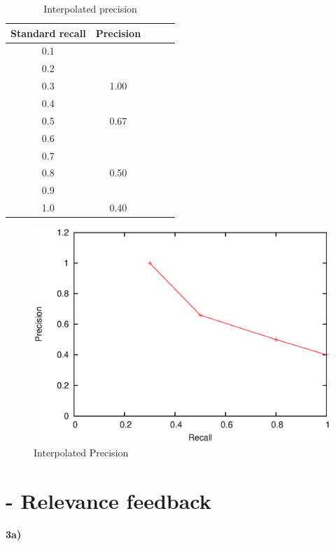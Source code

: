 \documentclass[a4paper, norsk, 11pt]{scrartcl} %
\numberwithin{equation}{section} %
\numberwithin{figure}{section} %
\numberwithin{table}{section} %
\begin{document}
\begin{table}[ht]
\centering
\begin{tabular}{c c c c c}
\hline
Standard recall & Precision \\ [0.5ex]
\hline
0.1 & \\
0.2 & \\
0.3 & 1.00\\
0.4 & \\
0.5 & 0.67\\
0.6 & \\
0.7 & \\
0.8 & 0.50 \\
0.9 & \\
1.0 & 0.40 \\  
\hline
\end{tabular}
\caption{Interpolated precision}
\label{ipt}
\end{table}


\begin{figure}[ht!]
\centering
\includegraphics[scale=0.6]{ip_imp3.eps}
\caption{Interpolated Precision}
\label{ipf}
\end{figure}




\newpage

\section{- Relevance feedback}

\textbf{3a)}
\end{document}
